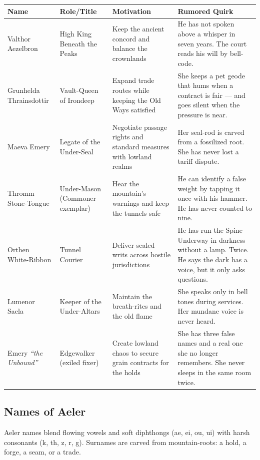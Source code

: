 \begin{longtable}{|p{}|p{}|p{}|p{}|}
\hline
\textbf{Name} & \textbf{Role/Title} & \textbf{Motivation} & \textbf{Rumored Quirk} \\
\hline
Valthor Aezelbron & High King Beneath the Peaks & Keep the ancient concord and balance the crownlands & He has not spoken above a whisper in seven years. The court reads his will by bell-code. \\
\hline
Grunhelda Thrainsdottir & Vault-Queen of Irondeep & Expand trade routes while keeping the Old Ways satisfied & She keeps a pet geode that hums when a contract is fair --- and goes silent when the pressure is near. \\
\hline
Maeva Emery & Legate of the Under-Seal & Negotiate passage rights and standard measures with lowland realms & Her seal-rod is carved from a fossilized root. She has never lost a tariff dispute. \\
\hline
Thromm Stone-Tongue & Under-Mason (Commoner exemplar) & Hear the mountain's warnings and keep the tunnels safe & He can identify a false weight by tapping it once with his hammer. He has never counted to nine. \\
\hline
Orthen White-Ribbon & Tunnel Courier & Deliver sealed writs across hostile jurisdictions & He has run the Spine Underway in darkness without a lamp. Twice. He says the dark has a voice, but it only asks questions. \\
\hline
Lumenor Saela & Keeper of the Under-Altars & Maintain the breath-rites and the old flame & She speaks only in bell tones during services. Her mundane voice is never heard. \\
\hline
Emery \textit{``the Unbound''} & Edgewalker (exiled fixer) & Create lowland chaos to secure grain contracts for the holds & She has three false names and a real one she no longer remembers. She never sleeps in the same room twice. \\
\hline
\end{longtable}

\subsection*{Names of Aeler}
\label{sec:aeler-names}

Aeler names blend flowing vowels and soft diphthongs (ae, ei, ou, ui) with harsh consonants (k, th, z, r, g). Surnames are carved from mountain-roots: a hold, a forge, a seam, or a trade.

